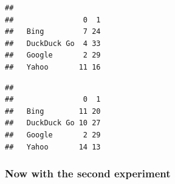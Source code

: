 \documentclass[
  11pt,
]{article}
\newenvironment{Shaded}{\begin{snugshade}}{\end{snugshade}}
\newcommand{\FunctionTok}[1]{\textcolor[rgb]{0.13,0.29,0.53}{\textbf{#1}}}
\newcommand{\NormalTok}[1]{#1}
\newcommand{\SpecialCharTok}[1]{\textcolor[rgb]{0.81,0.36,0.00}{\textbf{#1}}}
\begin{document}
\begin{Shaded}
\end{Shaded}

\begin{verbatim}
##              
##                0  1
##   Bing         7 24
##   DuckDuck Go  4 33
##   Google       2 29
##   Yahoo       11 16
\end{verbatim}

\begin{Shaded}
\end{Shaded}

\begin{verbatim}
##              
##                0  1
##   Bing        11 20
##   DuckDuck Go 10 27
##   Google       2 29
##   Yahoo       14 13
\end{verbatim}

\hypertarget{now-with-the-second-experiment}{%
\subsubsection{Now with the second experiment}\label{now-with-the-second-experiment}}
\end{document}
